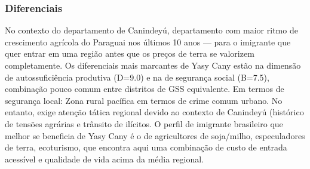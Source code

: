 \subsubsection*{Diferenciais}\label{dif-yasy-cany-1411}
No contexto do departamento de Canindeyú, departamento com maior ritmo de crescimento agrícola do Paraguai nos últimos 10 anos — para o imigrante que quer entrar em uma região antes que os preços de terra se valorizem completamente. Os diferenciais mais marcantes de Yasy Cany estão na dimensão de autossuficiência produtiva (D=9.0) e na de segurança social (B=7.5), combinação pouco comum entre distritos de GSS equivalente. Em termos de segurança local: Zona rural pacífica em termos de crime comum urbano. No entanto, exige atenção tática regional devido ao contexto de Canindeyú (histórico de tensões agrárias e trânsito de ilícitos. O perfil de imigrante brasileiro que melhor se beneficia de Yasy Cany é o de agricultores de soja/milho, especuladores de terra, ecoturismo, que encontra aqui uma combinação de custo de entrada acessível e qualidade de vida acima da média regional.
